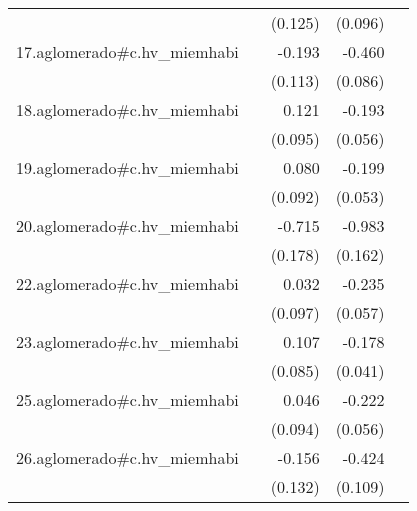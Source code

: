 {\begin{longtable}{l*{4}{D{.}{.}{-1}}}
            &                     &     (0.125)         &     (0.096)         &                     \\
\addlinespace
17.aglomerado#c.hv\_miemhabi&                     &      -0.193         &      -0.460\sym{***}&                     \\
            &                     &     (0.113)         &     (0.086)         &                     \\
\addlinespace
18.aglomerado#c.hv\_miemhabi&                     &       0.121         &      -0.193\sym{***}&                     \\
            &                     &     (0.095)         &     (0.056)         &                     \\
\addlinespace
19.aglomerado#c.hv\_miemhabi&                     &       0.080         &      -0.199\sym{***}&                     \\
            &                     &     (0.092)         &     (0.053)         &                     \\
\addlinespace
20.aglomerado#c.hv\_miemhabi&                     &      -0.715\sym{***}&      -0.983\sym{***}&                     \\
            &                     &     (0.178)         &     (0.162)         &                     \\
\addlinespace
22.aglomerado#c.hv\_miemhabi&                     &       0.032         &      -0.235\sym{***}&                     \\
            &                     &     (0.097)         &     (0.057)         &                     \\
\addlinespace
23.aglomerado#c.hv\_miemhabi&                     &       0.107         &      -0.178\sym{***}&                     \\
            &                     &     (0.085)         &     (0.041)         &                     \\
\addlinespace
25.aglomerado#c.hv\_miemhabi&                     &       0.046         &      -0.222\sym{***}&                     \\
            &                     &     (0.094)         &     (0.056)         &                     \\
\addlinespace
26.aglomerado#c.hv\_miemhabi&                     &      -0.156         &      -0.424\sym{***}&                     \\
            &                     &     (0.132)         &     (0.109)         &                     \\

\end{longtable}}
